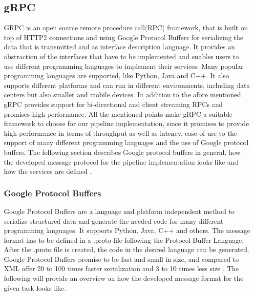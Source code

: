 \subsection{gRPC}
GRPC is an open source remote procedure call(RPC) framework, that is built on top of HTTP2 connections and using Google Protocol Buffers for serializing the data that is transmitted and as interface description language. It provides an abstraction of the interfaces that have to be implemented and enables users to use different programming languages to implement their services. Many popular programming languages are supported, like Python, Java and C++. It also supports different platforms and can run in different environments, including data centers but also smaller and mobile devices. In addition to the afore mentioned gRPC provides support for bi-directional and client streaming RPCs and promises high performance. All the mentioned points make gRPC a suitable framework to choose for our pipeline implementation, since it promises to provide high performance in terms of throughput as well as latency, ease of use to the support of many different programming languages and the use of Google protocol buffers. The following section describes Google protocol buffers in general, how the developed message protocol for the pipeline implementation looks like and how the services are defined \cite{grpc}.
\subsubsection{Google Protocol Buffers}
 Google Protocol Buffers are a language and platform independent method to serialize structured data and generate the needed code for many different programming languages. It supports Python, Java, C++ and others. The message format has to be defined in a .proto file following the Protocol Buffer Language. After the .proto file is created, the code in the desired language can be generated. Google Protocol Buffers promise to be fast and small in size, and compared to XML offer 20 to 100 times faster serialization and 3 to 10 times less size \cite{protobuf}.
 The following will provide an overview on how the developed message format for the given task looks like.

